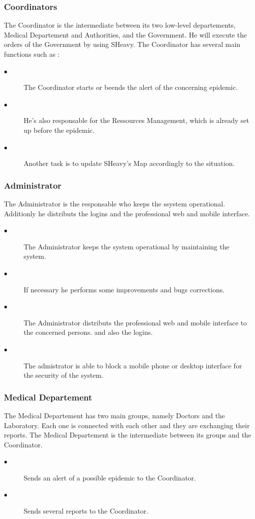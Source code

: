 \subsubsection{Coordinators}
The Coordinator is the intermediate between its two low-level departements,
Medical Departement and Authorities, and the Government. He will execute the
orders of the Government by using SHeavy. The Coordinator has several main
functions such as :
\begin{description}
 \item[$\bullet$] The Coordinator starts or beends the alert of the concerning
 epidemic.
 \item[$\bullet$] He's also responsable for the Ressources Management, which is
 already set up before the epidemic.
 \item[$\bullet$] Another task is to update SHeavy's Map accordingly to the
 situation.
\end{description} 

\subsubsection{Administrator}
The Administrator is the responsable who keeps the ssystem operational.
Additionly he distributs the logins and the professional web and mobile
interface.
\begin{description}
 \item[$\bullet$] The Administrator keeps the system operational by maintaining
 the system.
 \item[$\bullet$] If necessary he performs some improvements and bugs
 corrections.
 \item[$\bullet$] The Administrator distributs the professional web and mobile
 interface to the concerned persons. and also the logins.
 \item[$\bullet$]  The admistrator is able to block a mobile phone or desktop
 interface for the security of the system.
\end{description} 

\subsubsection{Medical Departement}
The Medical Departement has two main groups, namely Doctors and the Laboratory.
Each one is connected with each other and they are exchanging their reports. The
Medical Departement is the intermediate between its groups and the Coordinator.
\begin{description}
 \item[$\bullet$] Sends an alert of a possible epidemic to the Coordinator.
 \item[$\bullet$] Sends several reports to the Coordinator.
\end{description} 

